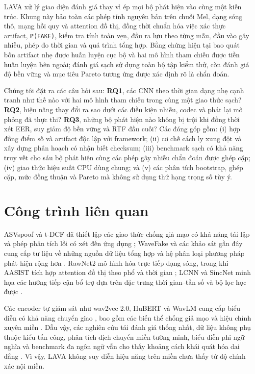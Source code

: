 \documentclass[10pt,journal,onecolumn,a4paper]{IEEEtran}
\begin{document}
LAVA xử lý giao diện đánh giá thay vì ép mọi bộ phát hiện vào cùng một kiến trúc. Khung này bảo toàn các phép tính nguyên bản trên chuỗi Mel, dạng sóng thô, mạng hồi quy và attention đồ thị, đồng thời chuẩn hóa việc xác thực artifact, \texttt{P(FAKE)}, kiểm tra tính toàn vẹn, đầu ra lưu theo từng mẫu, đầu vào gây nhiễu, phép đo thời gian và quá trình tổng hợp. Bằng chứng hiện tại bao quát bốn artifact nhẹ được huấn luyện cục bộ và hai mô hình tham chiếu được tiền huấn luyện bên ngoài; đánh giá sạch sử dụng toàn bộ tập kiểm thử, còn đánh giá độ bền vững và mục tiêu Pareto tương ứng được xác định rõ là chẩn đoán.

Chúng tôi đặt ra các câu hỏi sau: \textbf{RQ1}, các CNN theo thời gian dạng nhẹ cạnh tranh như thế nào với hai mô hình tham chiếu trong cùng một giao thức sạch? \textbf{RQ2}, hiệu năng thay đổi ra sao dưới các điều kiện nhiễu, codec và phát lại mô phỏng đã thực thi? \textbf{RQ3}, những bộ phát hiện nào không bị trội khi đồng thời xét EER, suy giảm độ bền vững và RTF đầu cuối? Các đóng góp gồm: (i) hợp đồng điểm số và artifact độc lập với framework; (ii) cơ chế cách ly xung đột và xây dựng phân hoạch có nhận biết checksum; (iii) benchmark sạch có khả năng truy vết cho sáu bộ phát hiện cùng các phép gây nhiễu chẩn đoán được ghép cặp; (iv) giao thức hiệu suất CPU dùng chung; và (v) các phân tích bootstrap, ghép cặp, mức đồng thuận và Pareto mà không sử dụng thứ hạng trọng số tùy ý.

\section{Công trình liên quan}
ASVspoof và t-DCF đã thiết lập các giao thức chống giả mạo có khả năng tái lập và phép phân tích lỗi có xét đến ứng dụng \cite{wu2015asvspoof,kinnunen2017asvspoof,todisco2019asvspoof,yamagishi2021asvspoof,kinnunen2018tdcf}; WaveFake và các khảo sát gần đây cung cấp tư liệu về những nguồn dữ liệu tổng hợp và hệ phân loại phương pháp phát hiện rộng hơn \cite{frank2021wavefake,yi2023survey,li2024survey}. RawNet2 mô hình hóa trực tiếp dạng sóng, trong khi AASIST tích hợp attention đồ thị theo phổ và thời gian \cite{tak2021rawnet2,jung2022aasist,velickovic2018gat}; LCNN và SincNet minh họa các hướng tiếp cận bổ trợ dựa trên đặc trưng thời gian--tần số và bộ lọc học được \cite{wu2020lcnn,ravanelli2018sincnet}.

Các encoder tự giám sát như wav2vec 2.0, HuBERT và WavLM cung cấp biểu diễn có khả năng chuyển giao \cite{baevski2020wav2vec,hsu2021hubert,chen2022wavlm}, bao gồm các biến thể chống giả mạo và hiệu chỉnh xuyên miền \cite{tak2022wav2vec,pascu2024calibrated}. Dẫu vậy, các nghiên cứu tái đánh giá thống nhất, dữ liệu không phụ thuộc kiểu tấn công, phân tích dịch chuyển miền tường minh, biểu diễn phi ngữ nghĩa và benchmark đa ngôn ngữ vẫn cho thấy khoảng cách khái quát hóa dai dẳng \cite{muller2022generalize,kawa2022attack,muller2024harder,li2024crossdomain,das2025nonsemantic,ciobanu2026xmad}. Vì vậy, LAVA không suy diễn hiệu năng trên miền chưa thấy từ độ chính xác nội miền.
\end{document}
